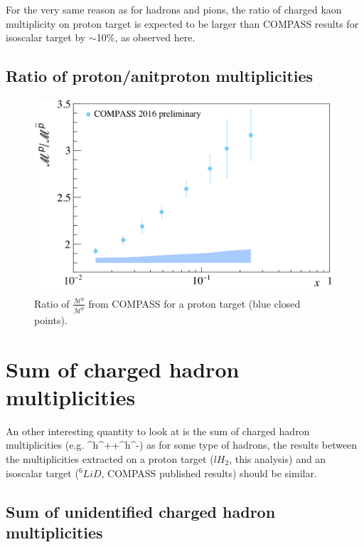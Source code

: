 For the very same reason as for hadrons and pions, the ratio of charged kaon multiplicity on proton target is expected to be larger than COMPASS results for isoscalar target by $\sim$10\%, as observed here.

\newpage

\subsection{Ratio of proton/anitproton multiplicities}

\begin{figure}[!h]
  \centering
	\includegraphics[scale=0.5]{./gfx/pr.png}
	\caption{Ratio of $\frac{\mathscr{M}^{p}}{\mathscr{M}^{\overline{p}}}$ from COMPASS for a proton target (blue closed points).}
	\label{pic:pratio}
\end{figure}

\section{Sum of charged hadron multiplicities}

An other interesting quantity to look at is the sum of charged hadron multiplicities (e.g. ^{h^+}+^{h^-}) as for some type of hadrons, the results between the multiplicities extracted on a proton target ($lH_2$, this analysis) and an isoscalar target ($^6LiD$, COMPASS published results) should be similar.

\subsection{Sum of unidentified charged hadron multiplicities}

